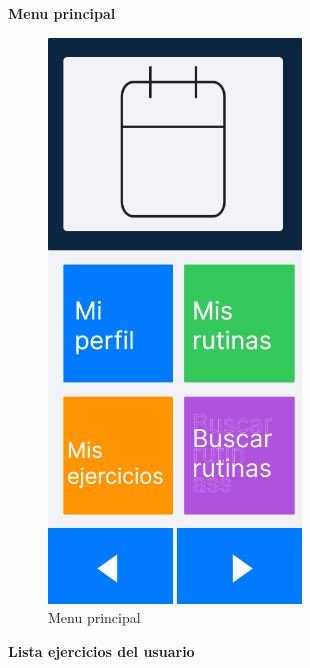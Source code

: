 \newpage

\textbf{Menu principal}

\begin{figure}[H]
   \centering
    \includegraphics[width=0.6\textwidth]{fotos/Frame 30.png}
    \caption{Menu principal}
    \label{fig:Menu principal}
\end{figure}

\newpage

\textbf{Lista ejercicios del usuario}

